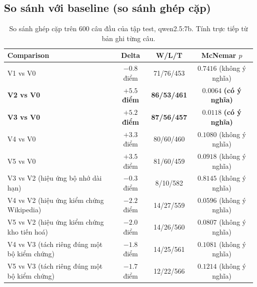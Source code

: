 \documentclass[11pt]{article}
\begin{document}
\subsection{So sánh với baseline (so sánh ghép cặp)}
\begin{table}[h]
  \centering
  \caption{So sánh ghép cặp trên 600 câu đầu của tập test, qwen2.5:7b. Tính trực tiếp từ bản ghi từng câu.}
  \label{tab:paired}
  \small
  \begin{tabular}{@{}p{}cc c@{}}
    \toprule
    Comparison & Delta & W/L/T & McNemar $p$ \\
    \midrule
    V1 vs V0 & $-0.8$ điểm & 71/76/453 & $0.7416$ (không ý nghĩa) \\
    \textbf{V2 vs V0} & $\mathbf{+5.5}$ \textbf{điểm} & \textbf{86/53/461} & $\mathbf{0.0064}$ \textbf{(có ý nghĩa)} \\
    \textbf{V3 vs V0} & $\mathbf{+5.2}$ \textbf{điểm} & \textbf{87/56/457} & $\mathbf{0.0118}$ \textbf{(có ý nghĩa)} \\
    V4 vs V0 & $+3.3$ điểm & 80/60/460 & $0.1080$ (không ý nghĩa) \\
    V5 vs V0 & $+3.5$ điểm & 81/60/459 & $0.0918$ (không ý nghĩa) \\
    V3 vs V2 (hiệu ứng bộ nhớ dài hạn) & $-0.3$ điểm & 8/10/582 & $0.8145$ (không ý nghĩa) \\
    V4 vs V2 (hiệu ứng kiểm chứng Wikipedia) & $-2.2$ điểm & 14/27/559 & $0.0596$ (không ý nghĩa) \\
    V5 vs V2 (hiệu ứng kiểm chứng kho tiến hoá) & $-2.0$ điểm & 14/26/560 & $0.0807$ (không ý nghĩa) \\
    V4 vs V3 (tách riêng đúng một bộ kiểm chứng) & $-1.8$ điểm & 14/25/561 & $0.1081$ (không ý nghĩa) \\
    V5 vs V3 (tách riêng đúng một bộ kiểm chứng) & $-1.7$ điểm & 12/22/566 & $0.1214$ (không ý nghĩa) \\
    \bottomrule
  \end{tabular}
\end{table}
\end{document}
